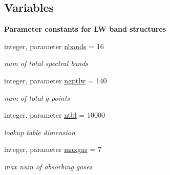 \subsection*{Variables}
\begin{Indent}\textbf{ Parameter constants for LW band structures}\par
\begin{DoxyCompactItemize}
\item 
\mbox{\label{namespacemodule__radlw__parameters_a48e11b992a80595d71c92f7c9bfbe19c}} 
integer, parameter \hyperlink{namespacemodule__radlw__parameters_a48e11b992a80595d71c92f7c9bfbe19c}{nbands} = 16
\begin{DoxyCompactList}\small\item\em num of total spectral bands \end{DoxyCompactList}\item 
\mbox{\label{namespacemodule__radlw__parameters_a05fe17fe932ce62a3ae2c6c564584321}} 
integer, parameter \hyperlink{namespacemodule__radlw__parameters_a05fe17fe932ce62a3ae2c6c564584321}{ngptlw} = 140
\begin{DoxyCompactList}\small\item\em num of total g-\/points \end{DoxyCompactList}\item 
\mbox{\label{namespacemodule__radlw__parameters_a61ae33b9db5bac9962f72e2a0db3c0e4}} 
integer, parameter \hyperlink{namespacemodule__radlw__parameters_a61ae33b9db5bac9962f72e2a0db3c0e4}{ntbl} = 10000
\begin{DoxyCompactList}\small\item\em lookup table dimension \end{DoxyCompactList}\item 
\mbox{\label{namespacemodule__radlw__parameters_a01330b4ad09907f2db51cb516ed21033}} 
integer, parameter \hyperlink{namespacemodule__radlw__parameters_a01330b4ad09907f2db51cb516ed21033}{maxgas} = 7
\begin{DoxyCompactList}\small\item\em max num of absorbing gases \end{DoxyCompactList}\item 
\mbox{\label{namespacemodule__radlw__parameters_a5817221936731c6ee6443da6a64e934e}} 

\end{DoxyCompactItemize}
\end{Indent}
